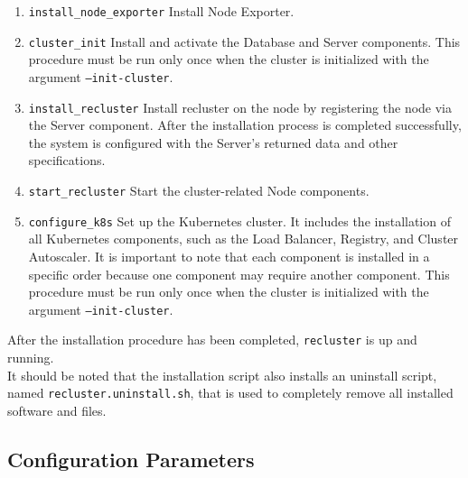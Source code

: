 \begin{enumerate}
  \item \texttt{install\_node\_exporter}
    \newline
    Install Node Exporter.

  \item \texttt{cluster\_init}
    \newline
    Install and activate the Database and Server components.
    \newline
    This procedure must be run only once when the cluster is initialized with the
    argument \texttt{--init-cluster}.

  \item \texttt{install\_recluster}
    \newline
    Install recluster on the node by registering the node via the Server
    component.
    \newline
    After the installation process is completed successfully, the system is
    configured with the Server's returned data and other specifications.

  \item \texttt{start\_recluster}
    \newline
    Start the cluster-related Node components.

  \item \texttt{configure\_k8s}
    \newline
    Set up the Kubernetes cluster.
    \newline
    It includes the installation of all Kubernetes components, such as the Load
    Balancer, Registry, and Cluster Autoscaler. It is important to note that each
    component is installed in a specific order because one component may require
    another component.
    \newline
    This procedure must be run only once when the cluster is initialized with
    the argument \texttt{--init-cluster}.
\end{enumerate}

After the installation procedure has been completed, \texttt{recluster} is up
and running. \\ %
It should be noted that the installation script also installs an uninstall
script, named \texttt{recluster.uninstall.sh}, that is used to completely remove
all installed software and files.

\subsection{Configuration Parameters}
\label{subsec:implementation_installer_configuration_parameters}

